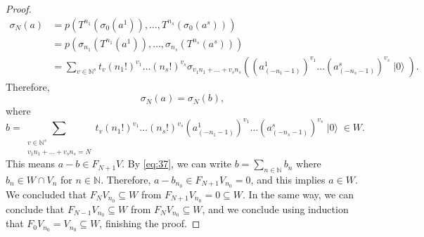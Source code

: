 \documentclass[a4paper, 12pt, reqno]{amsart}
\theoremstyle{remark}
\numberwithin{equation}{subsection}
\DeclareMathOperator{\vac}{|0\rangle}
\begin{document}
\begin{proof}
  \begin{align*}
    \sigma_N(a) &= p(T^{n_1}(\sigma_0(a^1)), \dots, T^{n_s}(\sigma_0(a^s))) \\
    &= p(\sigma_{n_1}(T^{n_1}(a^1)), \dots, \sigma_{n_s}(T^{n_s}(a^s))) \\
    &= \sum_{v \in \mathbb{N}^s}t_v(n_1!)^{v_1}\dots(n_s!)^{v_s}\sigma_{v_1n_1 + \dots + v_sn_s}((a^1_{(-n_1 - 1)})^{v_1}\dots(a^s_{(-n_s - 1)})^{v_s}\vac).
  \end{align*}
  Therefore,
  \begin{equation*}
    \sigma_N(a) = \sigma_N(b),
  \end{equation*}
  where
  \begin{equation*}
    b = \sum_{\substack{v \in \mathbb{N}^s \\ v_1n_1 + \dots + v_sn_s = N}}t_v(n_1!)^{v_1}\dots(n_s!)^{v_s}(a^1_{(-n_1 - 1)})^{v_1}\dots(a^s_{(-n_s - 1)})^{v_s}\vac \in W.
  \end{equation*}
  This means $a - b \in F_{N + 1}V$.
  By \eqref{eq:37}, we can write $b = \sum_{n \in \mathbb{N}}b_n$ where $b_n \in W \cap V_n$ for $n \in \mathbb{N}$.
  Therefore, $a - b_{n_0} \in F_{N + 1}V_{n_0} = 0$, and this implies $a \in W$.
  We concluded that $F_NV_{n_0} \subseteq W$ from $F_{N + 1}V_{n_0} = 0 \subseteq W$.
  In the same way, we can conclude that $F_{N - 1}V_{n_0} \subseteq W$ from $F_NV_{n_0} \subseteq W$, and we conclude using induction that $F_0V_{n_0} = V_{n_0} \subseteq W$, finishing the proof.
\end{proof}
\end{document}
